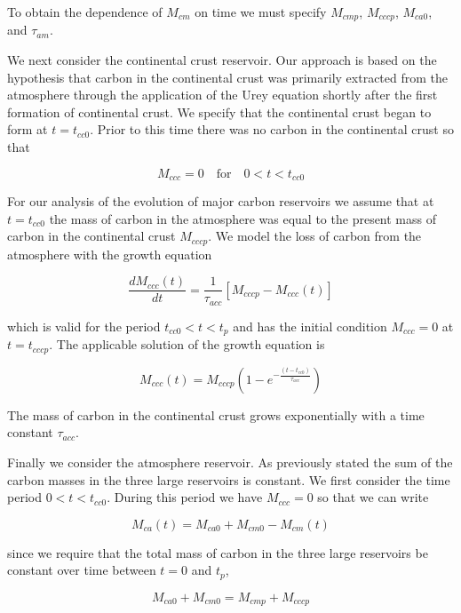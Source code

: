 To obtain the dependence of $M_{cm}$ on time we must specify $M_{cmp}$, $M_{cccp}$, $M_{ca0}$, and $\tau_{am}$.


We next consider the continental crust reservoir. Our approach is based on the hypothesis that carbon in the continental crust was primarily extracted from the atmosphere through the application of the Urey equation shortly after the first formation of continental crust. We specify that the continental crust began to form at $t=t_{cc0}$. Prior to this time there was no carbon in the continental crust so that

\begin{equation}
  M_{ccc} = 0 \quad \text{for} \quad 0 < t < t_{cc0}
\end{equation}

For our analysis of the evolution of major carbon reservoirs we assume that at $t=t_{cc0}$ the mass of carbon in the atmosphere was equal to the present mass of carbon in the continental crust $M_{cccp}$. We model the loss of carbon from the atmosphere with the growth equation

\begin{equation}
    \frac{d M_{ccc}(t)}{d t} = \frac{1}{\tau_{acc}} [M_{cccp} - M_{ccc}(t)]
\end{equation}

which is valid for the period $t_{cc0} < t < t_p$ and has the initial condition $M_{ccc} = 0$ at $t = t_{cccp}$. The applicable solution of the growth equation is

\begin{equation}
    M_{ccc}(t) = M_{cccp} (1 - e^{-\frac{(t-t_{cc0})}{\tau_{acc}}} )
\end{equation}

The mass of carbon in the continental crust grows exponentially with a time constant $\tau_{acc}$.

Finally we consider the atmosphere reservoir. As previously stated the sum of the carbon masses in the three large reservoirs is constant. We first consider the time period $0 < t < t_{cc0}$. During this period we have $M_{ccc}=0$ so that we can write

\begin{equation}
    M_{ca}(t) = M_{ca0} + M_{cm0} - M_{cm}(t)
\end{equation}

since we require that the total mass of carbon in the three large reservoirs be constant over time between $t=0$ and $t_p$,

\begin{equation}
  M_{ca0} + M_{cm0} = M_{cmp} + M_{cccp}
\end{equation}

